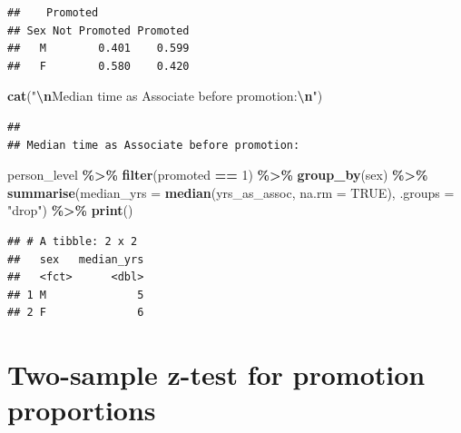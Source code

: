 \documentclass[
]{article}
\newenvironment{Shaded}{\begin{snugshade}}{\end{snugshade}}
\newcommand{\AttributeTok}[1]{\textcolor[rgb]{0.13,0.29,0.53}{#1}}
\newcommand{\ConstantTok}[1]{\textcolor[rgb]{0.56,0.35,0.01}{#1}}
\newcommand{\DecValTok}[1]{\textcolor[rgb]{0.00,0.00,0.81}{#1}}
\newcommand{\FunctionTok}[1]{\textcolor[rgb]{0.13,0.29,0.53}{\textbf{#1}}}
\newcommand{\NormalTok}[1]{#1}
\newcommand{\SpecialCharTok}[1]{\textcolor[rgb]{0.81,0.36,0.00}{\textbf{#1}}}
\newcommand{\StringTok}[1]{\textcolor[rgb]{0.31,0.60,0.02}{#1}}
\begin{document}
\begin{verbatim}
##    Promoted
## Sex Not Promoted Promoted
##   M        0.401    0.599
##   F        0.580    0.420
\end{verbatim}

\begin{Shaded}
\begin{Highlighting}[]
\FunctionTok{cat}\NormalTok{(}\StringTok{"}\SpecialCharTok{\textbackslash{}n}\StringTok{Median time as Associate before promotion:}\SpecialCharTok{\textbackslash{}n}\StringTok{"}\NormalTok{)}
\end{Highlighting}
\end{Shaded}

\begin{verbatim}
## 
## Median time as Associate before promotion:
\end{verbatim}

\begin{Shaded}
\begin{Highlighting}[]
\NormalTok{person\_level }\SpecialCharTok{\%\textgreater{}\%}
  \FunctionTok{filter}\NormalTok{(promoted }\SpecialCharTok{==} \DecValTok{1}\NormalTok{) }\SpecialCharTok{\%\textgreater{}\%}
  \FunctionTok{group\_by}\NormalTok{(sex) }\SpecialCharTok{\%\textgreater{}\%}
  \FunctionTok{summarise}\NormalTok{(}\AttributeTok{median\_yrs =} \FunctionTok{median}\NormalTok{(yrs\_as\_assoc, }\AttributeTok{na.rm =} \ConstantTok{TRUE}\NormalTok{), }\AttributeTok{.groups =} \StringTok{"drop"}\NormalTok{) }\SpecialCharTok{\%\textgreater{}\%}
  \FunctionTok{print}\NormalTok{()}
\end{Highlighting}
\end{Shaded}

\begin{verbatim}
## # A tibble: 2 x 2
##   sex   median_yrs
##   <fct>      <dbl>
## 1 M              5
## 2 F              6
\end{verbatim}

\section{Two-sample z-test for promotion
proportions}\label{two-sample-z-test-for-promotion-proportions}
\end{document}
